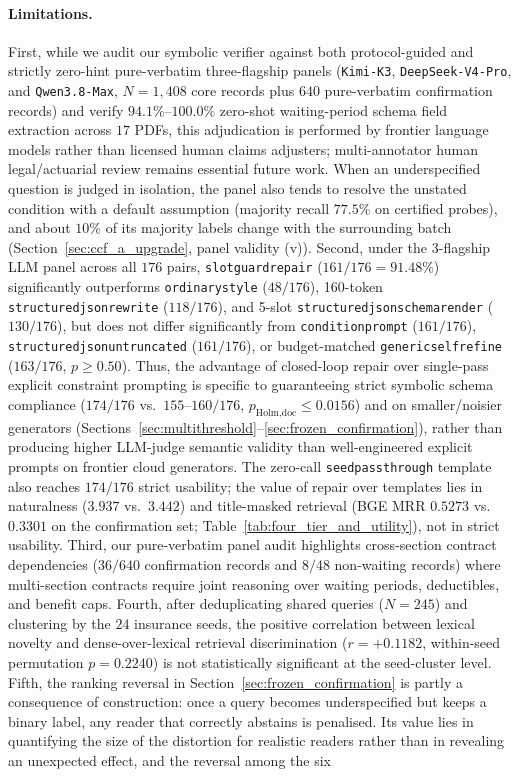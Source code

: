 \documentclass[10pt,twocolumn]{article}
\renewcommand{\_}{\textunderscore\allowbreak}
\begin{document}
\paragraph{Limitations.}
First, while we audit our symbolic verifier against both protocol-guided and strictly zero-hint pure-verbatim three-flagship panels (\texttt{Kimi-K3}, \texttt{DeepSeek-V4-Pro}, and \texttt{Qwen3.8-Max}, $N=1{,}408$ core records plus $640$ pure-verbatim confirmation records) and verify $94.1\%\text{--}100.0\%$ zero-shot waiting-period schema field extraction across $17$ PDFs, this adjudication is performed by frontier language models rather than licensed human claims adjusters; multi-annotator human legal/actuarial review remains essential future work. When an underspecified question is judged in isolation, the panel also tends to resolve the unstated condition with a default assumption (majority recall $77.5\%$ on certified probes), and about $10\%$ of its majority labels change with the surrounding batch (Section~\ref{sec:ccf_a_upgrade}, panel validity (v)). Second, under the 3-flagship LLM panel across all $176$ pairs, \texttt{slot\_guard\_repair} ($161/176 = 91.48\%$) significantly outperforms \texttt{ordinary\_style} ($48/176$), 160-token \texttt{structured\_json\_rewrite} ($118/176$), and 5-slot \texttt{structured\_json\_schema\_render} ($130/176$), but does not differ significantly from \texttt{condition\_prompt} ($161/176$), \texttt{structured\_json\_untruncated\_320} ($161/176$), or budget-matched \texttt{generic\_self\_refine} ($163/176$, $p \ge 0.50$). Thus, the advantage of closed-loop repair over single-pass explicit constraint prompting is specific to guaranteeing strict symbolic schema compliance ($174/176$ vs.\ $155\text{--}160/176$, $p_{\text{Holm,doc}} \le 0.0156$) and on smaller/noisier generators (Sections~\ref{sec:multithreshold}--\ref{sec:frozen_confirmation}), rather than producing higher LLM-judge semantic validity than well-engineered explicit prompts on frontier cloud generators. The zero-call \texttt{seed\_passthrough} template also reaches $174/176$ strict usability; the value of repair over templates lies in naturalness ($3.937$ vs.\ $3.442$) and title-masked retrieval (BGE MRR $0.5273$ vs.\ $0.3301$ on the confirmation set; Table~\ref{tab:four_tier_and_utility}), not in strict usability. Third, our pure-verbatim panel audit highlights cross-section contract dependencies ($36/640$ confirmation records and $8/48$ non-waiting records) where multi-section contracts require joint reasoning over waiting periods, deductibles, and benefit caps. Fourth, after deduplicating shared queries ($N=245$) and clustering by the $24$ insurance seeds, the positive correlation between lexical novelty and dense-over-lexical retrieval discrimination ($r = +0.1182$, within-seed permutation $p = 0.2240$) is not statistically significant at the seed-cluster level. Fifth, the ranking reversal in Section~\ref{sec:frozen_confirmation} is partly a consequence of construction: once a query becomes underspecified but keeps a binary label, any reader that correctly abstains is penalised. Its value lies in quantifying the size of the distortion for realistic readers rather than in revealing an unexpected effect, and the reversal among the six 
\end{document}
